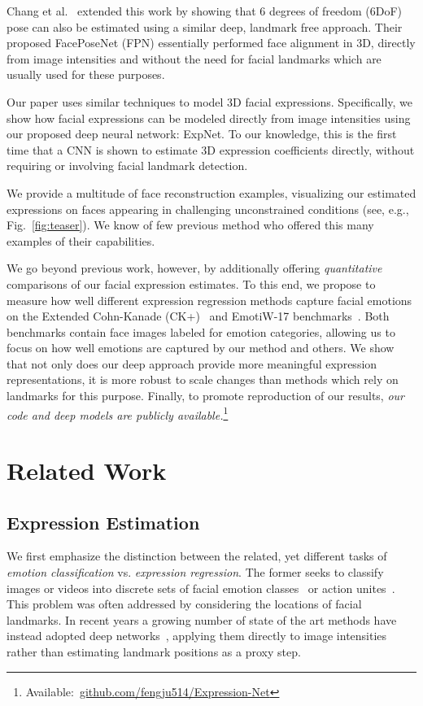\documentclass[a4paper, 10pt, conference]{ieeeconf}
\begin{document}
Chang et al.~\cite{chang17fpn} extended this work by showing that 6 degrees of freedom (6DoF) pose can also be estimated using a similar deep, landmark free approach. Their proposed FacePoseNet (FPN) essentially performed face alignment in 3D, directly from image intensities and without the need for facial landmarks which are usually used for these purposes.

Our paper uses similar techniques to model 3D facial expressions. Specifically, we show how facial expressions can be modeled directly from image intensities using our proposed deep neural network: ExpNet. To our knowledge, this is the first time that a CNN is shown to estimate 3D expression coefficients directly, without requiring or involving facial landmark detection.


We provide a multitude of face reconstruction examples, visualizing our estimated expressions on faces appearing in challenging unconstrained conditions (see, e.g., Fig.~\ref{fig:teaser}). We know of few previous method who offered this many examples of their capabilities.

We go beyond previous work, however, by additionally offering {\em quantitative} comparisons of our facial expression estimates. To this end, we propose to measure how well different expression regression methods capture facial emotions on the Extended Cohn-Kanade (CK+)~\cite{lucey2010extended} and EmotiW-17 benchmarks~\cite{dhall2017individual}. Both benchmarks contain face images labeled for emotion categories, allowing us to focus on how well emotions are captured by our method and others. We show that not only does our deep approach provide more meaningful expression representations, it is more robust to scale changes than methods which rely on landmarks for this purpose. Finally, to promote reproduction of our results, {\em our code and deep models are publicly available.}\footnote{Available:~\url{github.com/fengju514/Expression-Net}}


\section{Related Work}\label{sec:relatedwork}
\subsection{Expression Estimation}
We first emphasize the distinction between the related, yet different tasks of {\em emotion classification} vs. {\em expression regression}. The former seeks to classify images or videos into discrete sets of facial emotion classes~\cite{dhall2017individual,lucey2010extended} or action unites~\cite{fabian2016emotionet,zafeiriou2016facial}. This problem was often addressed by considering the locations of facial landmarks. In recent years a growing number of state of the art methods have instead adopted deep networks~\cite{kosti2017emotion,levi2015emotion,zhang2016gender}, applying them directly to image intensities rather than estimating landmark positions as a proxy step.
\end{document}
